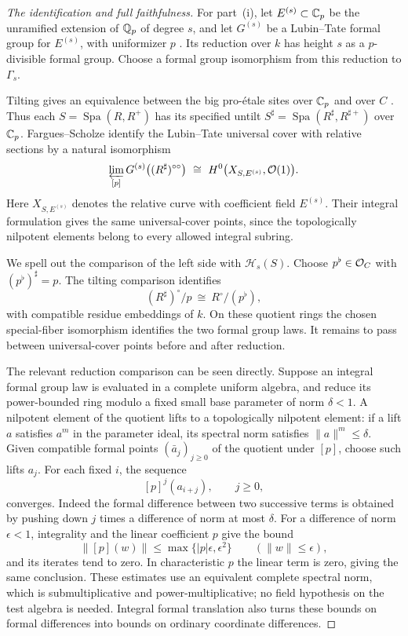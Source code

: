 \begin{proof}[The identification and full faithfulness]
For part~\textup{(i)}, let $E^{(s)}\subset\mathbb C_p$ be the unramified
extension of $\mathbb Q_p$ of degree $s$, and let $G^{(s)}$ be a Lubin--Tate
formal group for $E^{(s)}$, with uniformizer $p$
\cite[Theorem~1]{LT65}.  Its reduction over
$k$ has height $s$ as a $p$-divisible formal group.  Choose a formal
group isomorphism from this reduction to $\Gamma_s$.

Tilting gives an equivalence between the big pro-\'etale sites over
$\mathbb C_p$ and over $C$ \cite[Theorem~2.7]{LeBras18}.  Thus each
$S=\operatorname{Spa}(R,R^+)$ has its specified untilt
$S^\sharp=\operatorname{Spa}(R^\sharp,R^{\sharp+})$ over $\mathbb C_p$.
Fargues--Scholze identify the Lubin--Tate universal cover with relative
sections by a natural isomorphism
\cite[Proposition~II.2.2]{FS21}
\[
  \varprojlim_{[p]}
     G^{(s)}\bigl((R^\sharp)^{\circ\circ}\bigr)
  \ \cong\
  H^0\bigl(X_{S,E^{(s)}},\mathcal O(1)\bigr).
\]
Here $X_{S,E^{(s)}}$ denotes the relative curve with coefficient field
$E^{(s)}$.  Their integral formulation gives the same universal-cover
points, since the topologically nilpotent elements belong to every
allowed integral subring.

We spell out the comparison of the left side with $\mathcal H_s(S)$.
Choose $p^\flat\in\mathcal O_C$ with $(p^\flat)^\sharp=p$.
The tilting comparison identifies
\[
  (R^\sharp)^\circ/p
    \ \cong\ R^\circ/(p^\flat),
\]
with compatible residue embeddings of $k$.  On these quotient rings
the chosen special-fiber isomorphism identifies the two formal group
laws.  It remains to pass between universal-cover points before and
after reduction.

The relevant reduction comparison can be seen directly.  Suppose an
integral formal group law is evaluated in a complete uniform algebra,
and reduce its power-bounded ring modulo a fixed small base parameter
of norm $\delta<1$.  A nilpotent element of the quotient lifts to a
topologically nilpotent element: if a lift $a$ satisfies
$a^m$ in the parameter ideal, its spectral norm satisfies
$\|a\|^m\leq\delta$.  Given compatible formal points
$(\bar a_j)_{j\geq0}$ of the quotient under $[p]$, choose such lifts
$a_j$.  For each fixed $i$, the sequence
\[
  [p]^j(a_{i+j}),\qquad j\geq0,
\]
converges.  Indeed the formal difference between two successive terms
is obtained by pushing down $j$ times a difference of norm at most
$\delta$.  For a difference of norm $\epsilon<1$, integrality and
the linear coefficient $p$ give the bound
\[
  \|[p](w)\|
     \leq\max\{|p|\epsilon,\epsilon^2\}
     \qquad (\|w\|\leq\epsilon),
\]
and its iterates tend to zero.  In characteristic $p$ the linear term
is zero, giving the same conclusion.  These estimates use an
equivalent complete spectral norm, which is submultiplicative and
power-multiplicative; no field hypothesis on the test algebra is
needed.  Integral formal translation also turns these bounds on
formal differences into bounds on ordinary coordinate differences.


\end{proof}

